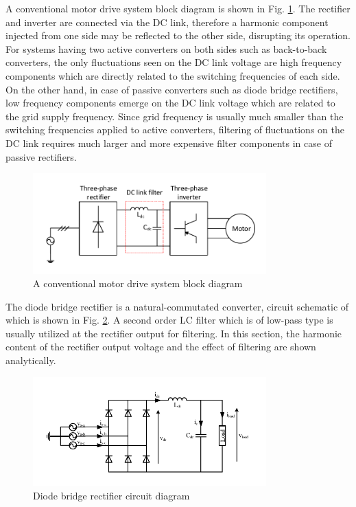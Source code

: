 \documentclass[conference,a4paper,twocolumn]{IEEEtran}
\begin{document}
A conventional motor drive system block diagram is shown in Fig. \ref{fig:conv_motor_drive}. The rectifier and inverter are connected via the DC link, therefore a harmonic component injected from one side may be reflected to the other side, disrupting its operation. For systems having two active converters on both sides such as back-to-back converters, the only fluctuations seen on the DC link voltage are high frequency components which are directly related to the switching frequencies of each side. On the other hand, in case of passive converters such as diode bridge rectifiers, low frequency components emerge on the DC link voltage which are related to the grid supply frequency. Since grid frequency is usually much smaller than the switching frequencies applied to active converters, filtering of fluctuations on the DC link requires much larger and more expensive filter components in case of passive rectifiers.
\begin{figure}[h]
  \centering
  \includegraphics[width=9cm]{conv_motor_drive}
  \caption{A conventional motor drive system block diagram}
  \label{fig:conv_motor_drive}
\end{figure}

The diode bridge rectifier is a natural-commutated converter, circuit schematic of which is shown in Fig. \ref{fig:rect_circuit}. A second order LC filter which is of low-pass type is usually utilized at the rectifier output for filtering. In this section, the harmonic content of the rectifier output voltage and the effect of filtering are shown analytically.

\begin{figure}[h]
  \centering
  \includegraphics[width=9cm]{rect_circuit}
  \caption{Diode bridge rectifier circuit diagram}
  \label{fig:rect_circuit}
\end{figure}
\end{document}
